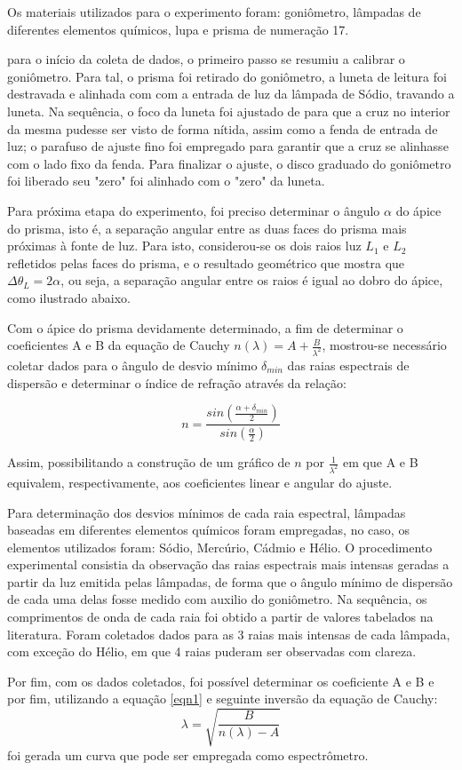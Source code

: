 Os materiais utilizados para o experimento foram: goniômetro, lâmpadas de diferentes elementos químicos, lupa e prisma de numeração 17.

para  o início da coleta de dados, o primeiro passo se resumiu a calibrar o goniômetro. Para tal, o prisma foi retirado do goniômetro, a luneta de leitura foi destravada e alinhada com com a entrada de luz da lâmpada de Sódio, travando a luneta. Na sequência, o foco da luneta foi ajustado de para que a cruz no interior da mesma pudesse ser visto de forma nítida, assim como a fenda de entrada de luz; o parafuso de ajuste fino foi empregado para garantir que a cruz se alinhasse com o lado fixo da fenda. Para finalizar o ajuste, o disco graduado do goniômetro foi liberado seu "zero" foi alinhado com o "zero" da luneta.

Para próxima etapa do experimento, foi preciso determinar o ângulo $\alpha$ do ápice do prisma, isto é, a separação angular entre as duas faces do prisma mais próximas à fonte de luz. Para isto, considerou-se os dois raios luz $L_1$ e $L_2$ refletidos pelas faces do prisma, e o resultado geométrico que mostra que $\Delta \theta_L = 2\alpha$, ou seja, a separação angular entre os raios é igual ao dobro do ápice, como ilustrado abaixo.



Com o ápice do prisma devidamente determinado, a fim de determinar o coeficientes A e B da equação de Cauchy $n(\lambda) = A + \frac{B}{\lambda^2}$, mostrou-se necessário coletar dados para o ângulo de desvio mínimo $\delta_{min}$ das raias espectrais de dispersão e determinar o índice de refração através da relação:

\begin{equation}
    n = \frac{sin(\frac{\alpha + \delta_{min}}{2})}{sin(\frac{\alpha}{2})}
    \label{eqn1}
\end{equation}

 Assim, possibilitando a construção de um gráfico de $n$ por $\frac{1}{\lambda^2}$ em que A e B equivalem, respectivamente, aos coeficientes linear e angular do ajuste.

Para determinação dos desvios mínimos de cada raia espectral, lâmpadas baseadas em diferentes elementos químicos foram empregadas, no caso, os elementos utilizados foram: Sódio, Mercúrio, Cádmio e Hélio. O procedimento experimental consistia da observação das raias espectrais mais intensas geradas a partir da luz emitida pelas lâmpadas, de forma que o ângulo mínimo de dispersão de cada uma delas fosse medido com auxilio do goniômetro. Na sequência, os comprimentos de onda de cada raia foi obtido a partir de valores tabelados na literatura. Foram coletados dados para as 3 raias mais intensas de cada lâmpada, com exceção do Hélio, em que 4 raias puderam ser observadas com clareza.

Por fim, com os dados coletados, foi possível determinar os coeficiente A e B e por fim, utilizando a equação \ref{eqn1} e seguinte inversão da equação de Cauchy:
\begin{equation}
    \lambda = \sqrt{\frac{B}{n(\lambda)-A}}
\end{equation} 
foi gerada um curva que pode ser empregada como espectrômetro.



